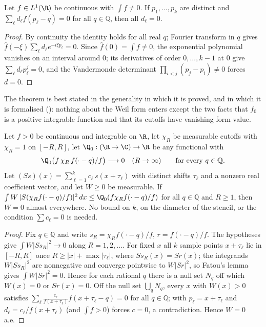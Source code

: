 \begin{lemma}\label{lem:indep}
Let $f\in L^1(\R)$ be continuous with $\int f\ne0$. If $p_1,\dots,p_k$ are distinct and
$\sum_\ell d_\ell f(p_\ell-q)=0$ for all $q\in\mathbb Q$, then all $d_\ell=0$.
\end{lemma}
\begin{proof}
By continuity the identity holds for all real $q$; Fourier transform in $q$ gives $\widehat f(-\xi)\sum_\ell d_\ell e^{-i\xi p_\ell}=0$.
Since $\widehat f(0)=\int f\ne0$, the exponential polynomial vanishes on an interval around $0$; its derivatives of order
$0,\dots,k-1$ at $0$ give $\sum_\ell d_\ell p_\ell^j=0$, and the Vandermonde determinant $\prod_{i<j}(p_j-p_i)\ne0$ forces $d=0$.
\end{proof}

The theorem is best stated in the generality in which it is proved, and in which it is formalised (): nothing
about the Weil form enters except the two facts that $f_0$ is a positive integrable function and that its cutoffs have vanishing
form value.

\begin{theorem}\label{thm:nominorant}
Let $f>0$ be continuous and integrable on $\R$, let $\chi_R$ be measurable cutoffs with $\chi_R=1$ on $[-R,R]$, let
$\Q_0:(\R\to\C)\to\R$ be any functional with
\[
 \Q_0\bigl(f\,\chi_R\,f(\cdot-q)/f\bigr)\longrightarrow0\quad(R\to\infty)\qquad\text{for every }q\in\mathbb Q .
\]
Let $(Ss)(x)=\sum_{\ell=1}^kc_\ell\,s(x+\tau_\ell)$ with distinct shifts $\tau_\ell$ and a nonzero real coefficient
vector, and let $W\ge0$ be measurable. If $\int W\,|S(\chi_Rf(\cdot-q)/f)|^2\,dx\le\Q_0(f\chi_Rf(\cdot-q)/f)$ for all $q\in\mathbb Q$ and
$R\ge1$, then $W=0$ almost everywhere. No bound on $k$, on the diameter of the stencil, or the condition $\sum c_\ell=0$ is needed.
\end{theorem}
\begin{proof}
Fix $q\in\mathbb Q$ and write $s_R=\chi_Rf(\cdot-q)/f$, $r=f(\cdot-q)/f$. The hypotheses give $\int W|Ss_R|^2\to0$ along $R=1,2,\dots$.
For fixed $x$ all $k$ sample points $x+\tau_\ell$ lie in $[-R,R]$ once $R\ge|x|+\max|\tau_\ell|$, where $Ss_R(x)=Sr(x)$; the integrands
$W|Ss_R|^2$ are nonnegative and converge pointwise to $W|Sr|^2$, so Fatou's lemma gives $\int W|Sr|^2=0$. Hence for each rational $q$
there is a null set $N_q$ off which $W(x)=0$ or $Sr(x)=0$. Off the null set $\bigcup_qN_q$, every $x$ with $W(x)>0$ satisfies
$\sum_\ell\frac{c_\ell}{f(x+\tau_\ell)}f(x+\tau_\ell-q)=0$ for all $q\in\mathbb Q$;  with $p_\ell=x+\tau_\ell$ and
$d_\ell=c_\ell/f(x+\tau_\ell)$ (and $\int f>0$) forces $c=0$, a contradiction. Hence $W=0$ a.e.
\end{proof}

